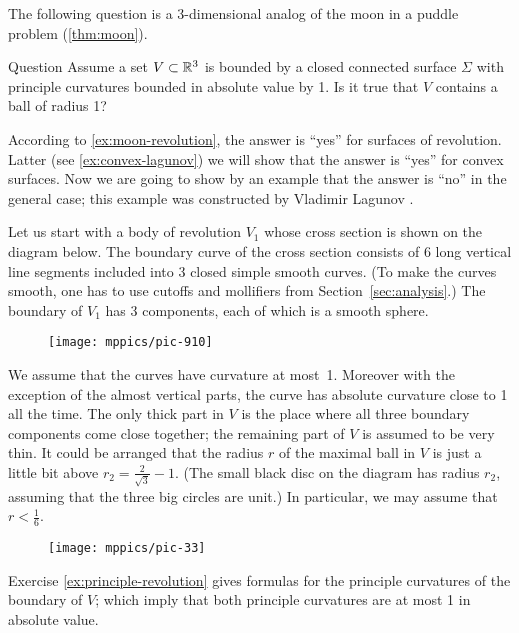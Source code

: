 The following question is a 3-dimensional analog of the moon in a puddle problem (\ref{thm:moon}).

\begin{thm}{Question}\label{quest:lagunov}
Assume a set $V\subset \mathbb{R}^3$ is bounded by a closed connected surface $\Sigma$ with 
principle curvatures bounded in absolute value by 1.
Is it true that $V$ contains a ball of radius 1?
\end{thm}

According to \ref{ex:moon-revolution}, the answer is ``yes'' for surfaces of revolution.
Latter (see \ref{ex:convex-lagunov})
we will show that the answer is ``yes'' for convex surfaces.
Now we are going to show by an example that the answer is  ``no'' in the general case;
this example was constructed by Vladimir Lagunov \cite{lagunov-1961}.


Let us start with a body of revolution $V_1$ whose cross section is shown on the diagram below.
The boundary curve of the cross section consists of 6 long vertical line segments included into 3 closed simple smooth curves.
(To make the curves smooth, one has to use cutoffs and mollifiers from Section~\ref{sec:analysis}.)
The boundary of $V_1$ has 3 components, each of which is a smooth sphere.

\begin{wrapfigure}{o}{20 mm}
\vskip-0mm
\centering
\texttt{[image: mppics/pic-910]}
\vskip0mm
\end{wrapfigure}

We assume that the curves have curvature at most~1.
Moreover with the exception of the almost vertical parts, the curve has absolute curvature close to 1 all the time.
The only thick part in $V$ is the place where all three boundary components come close together;
the remaining part of $V$ is assumed to be very thin.
It could be arranged that the radius $r$ of the maximal ball in $V$ is just a little bit above 
$r_2=\tfrac2{\sqrt{3}}-1$.
(The small black disc on the diagram has radius $r_2$,
assuming that the three big circles are unit.)
In particular, we may assume that $r<\tfrac16$.

\begin{figure}[h!]
\centering
\texttt{[image: mppics/pic-33]}
\vskip0mm
\end{figure}

Exercise \ref{ex:principle-revolution} gives formulas for the principle curvatures of the boundary of $V$;
which imply that both principle curvatures are at most 1 in absolute value.  

